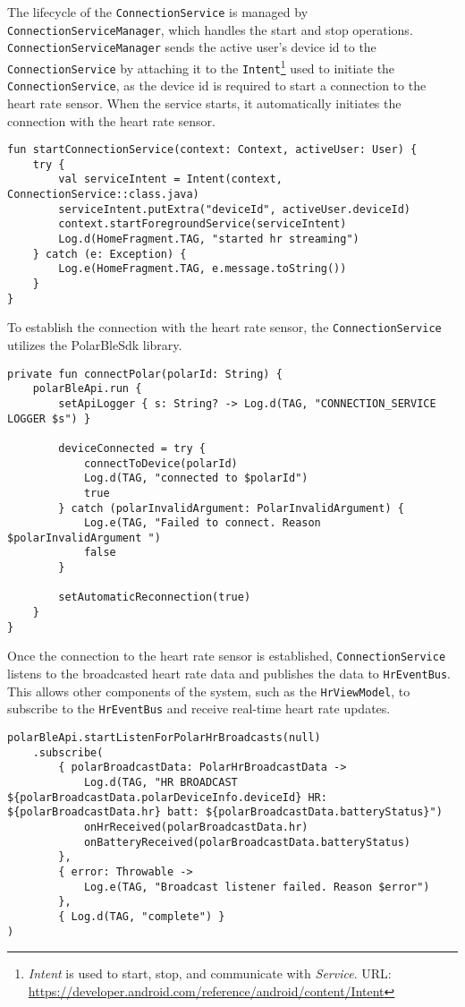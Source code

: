 The lifecycle of the \verb;ConnectionService; is managed by \verb;ConnectionServiceManager;, which handles the start and stop operations. 
\texttt{ConnectionServiceManager} sends the active user's device id to the \texttt{ConnectionService} by attaching it to the \texttt{Intent}\footnote{\emph{Intent} is used to start, stop, and communicate with \emph{Service}. URL: \url{https://developer.android.com/reference/android/content/Intent}} used to initiate the \texttt{ConnectionService},
as the device id is required to start a connection to the heart rate sensor.
When the service starts, it automatically initiates the connection with the heart rate sensor.
\begin{lstlisting}[caption={Function to start ConnectionService (Kotlin - ConnectionServiceManager)}]
fun startConnectionService(context: Context, activeUser: User) {
    try {
        val serviceIntent = Intent(context, ConnectionService::class.java)
        serviceIntent.putExtra("deviceId", activeUser.deviceId)
        context.startForegroundService(serviceIntent)
        Log.d(HomeFragment.TAG, "started hr streaming")
    } catch (e: Exception) {
        Log.e(HomeFragment.TAG, e.message.toString())
    }
}
\end{lstlisting}

To establish the connection with the heart rate sensor, the \verb;ConnectionService; utilizes the PolarBleSdk library.
\begin{lstlisting}[caption={Function to initiate connection to heart rate sensor (Kotlin - ConnectionService)}]
private fun connectPolar(polarId: String) {
    polarBleApi.run {
        setApiLogger { s: String? -> Log.d(TAG, "CONNECTION_SERVICE LOGGER $s") }

        deviceConnected = try {
            connectToDevice(polarId)
            Log.d(TAG, "connected to $polarId")
            true
        } catch (polarInvalidArgument: PolarInvalidArgument) {
            Log.e(TAG, "Failed to connect. Reason $polarInvalidArgument ")
            false
        }

        setAutomaticReconnection(true)
    }
}
\end{lstlisting}

Once the connection to the heart rate sensor is established, \verb;ConnectionService; listens to the broadcasted heart rate data and publishes the data to \verb;HrEventBus;.
This allows other components of the system, such as the \verb;HrViewModel;, to subscribe to the \verb;HrEventBus; and receive real-time heart rate updates. 
\begin{lstlisting}[caption={Heart rate data broadcast listener (Kotlin - ConnectionService)}]
polarBleApi.startListenForPolarHrBroadcasts(null)
    .subscribe(
        { polarBroadcastData: PolarHrBroadcastData ->
            Log.d(TAG, "HR BROADCAST ${polarBroadcastData.polarDeviceInfo.deviceId} HR: ${polarBroadcastData.hr} batt: ${polarBroadcastData.batteryStatus}")
            onHrReceived(polarBroadcastData.hr)
            onBatteryReceived(polarBroadcastData.batteryStatus)
        },
        { error: Throwable ->
            Log.e(TAG, "Broadcast listener failed. Reason $error")
        },
        { Log.d(TAG, "complete") }
)
\end{lstlisting}

